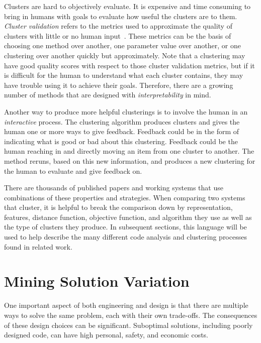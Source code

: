 Clusters are hard to objectively evaluate. It is expensive and time consuming to bring in humans with goals to evaluate how useful the clusters are to them. {\it Cluster validation} refers to the metrics used to approximate the quality of clusters with little or no human input~\cite{xu2005survey}. These metrics can be the basis of choosing one method over another, one parameter value over another, or one clustering over another quickly but approximately. Note that a clustering may have good quality scores with respect to those cluster validation metrics, but if it is difficult for the human to understand what each cluster contains, they may have trouble using it to achieve their goals. Therefore, there are a growing number of methods that are designed with {\it interpretability} in mind.



Another way to produce more helpful clusterings is to involve the human in an {\it interactive} process. The clustering algorithm produces clusters and gives the human one or more ways to give feedback. Feedback could be in the form of indicating what is good or bad about this clustering. Feedback could be the human reaching in and directly moving an item from one cluster to another. The method reruns, based on this new information, and produces a new clustering for the human to evaluate and give feedback on.



There are thousands of published papers and working systems that use combinations of these properties and strategies. When comparing two systems that cluster, it is helpful to break the comparison down by representation, features, distance function, objective function, and algorithm they use as well as the type of clusters they produce. In subsequent sections, this language will be used to help describe the many different code analysis and clustering processes found in related work.


\section{Mining Solution Variation}

One important aspect of both engineering and design is that there are multiple ways to solve the same problem, each with their own trade-offs. The consequences of these design choices can be significant. Suboptimal solutions, including poorly designed code, can have high personal, safety, and economic costs. 

